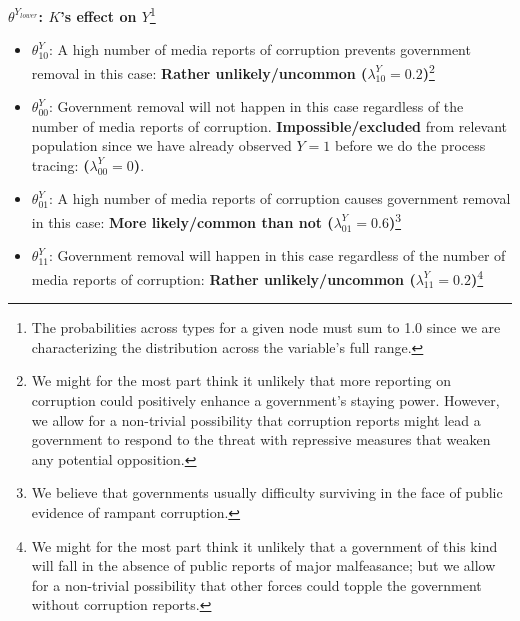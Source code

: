 \documentclass[12pt,]{book}
\let\rmarkdownfootnote\footnote%
\def\footnote{\protect\rmarkdownfootnote}
\begin{document}
\textbf{\(\theta^{Y_{lower}}\): \(K\)'s effect on \(Y\)}\footnote{The probabilities across types for a given node must sum to 1.0 since we are characterizing the distribution across the variable's full range.}

\begin{itemize}
\item
  \textbf{\(\theta_{10}^{Y}\)}: A high number of media reports of corruption prevents government removal in this case: \textbf{Rather unlikely/uncommon (\(\lambda^Y_{10}=0.2\))}\footnote{We might for the most part think it unlikely that more reporting on corruption could positively enhance a government's staying power. However, we allow for a non-trivial possibility that corruption reports might lead a government to respond to the threat with repressive measures that weaken any potential opposition.}
\item
  \textbf{\(\theta_{00}^{Y}\)}: Government removal will not happen in this case regardless of the number of media reports of corruption. \textbf{Impossible/excluded} from relevant population since we have already observed \(Y=1\) before we do the process tracing: \textbf{(\(\lambda^Y_{00}=0\))}.
\item
  \textbf{\(\theta_{01}^{Y}\)}: A high number of media reports of corruption causes government removal in this case: \textbf{More likely/common than not (\(\lambda^Y_{01}=0.6\))}\footnote{We believe that governments usually difficulty surviving in the face of public evidence of rampant corruption.}
\item
  \textbf{\(\theta_{11}^{Y}\)}: Government removal will happen in this case regardless of the number of media reports of corruption: \textbf{Rather unlikely/uncommon (\(\lambda^Y_{11}=0.2\))}\footnote{We might for the most part think it unlikely that a government of this kind will fall in the absence of public reports of major malfeasance; but we allow for a non-trivial possibility that other forces could topple the government without corruption reports.}
\end{itemize}
\end{document}
